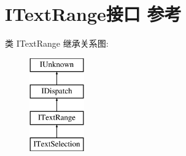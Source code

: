 \hypertarget{interface_i_text_range}{}\section{I\+Text\+Range接口 参考}
\label{interface_i_text_range}
类 I\+Text\+Range 继承关系图\+:\begin{figure}[H]
\begin{center}
\leavevmode
\includegraphics[height=4.000000cm]{interface_i_text_range}
\end{center}
\end{figure}
